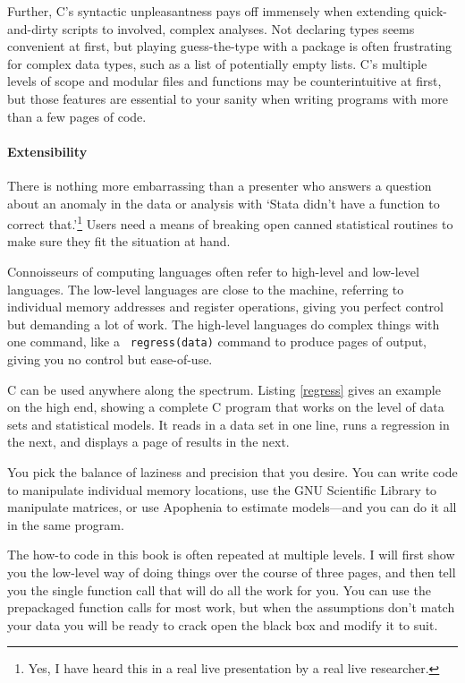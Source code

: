 Further, C's syntactic unpleasantness pays off immensely when extending
quick-and-dirty scripts to involved, complex analyses.
Not declaring types seems convenient at first, but playing guess-the-type
with a package is often frustrating for complex data types, such
as a list of potentially empty lists. C's multiple levels of scope and 
modular files and functions may be counterintuitive at first,
but those features are essential to your sanity when
writing programs with more than a few pages of code.

\paragraph{Extensibility}
There is nothing more embarrassing than a presenter who answers a question
about an anomaly in the data or analysis with `Stata didn't have a function to
correct that.'\footnote{Yes, I have heard this in a real live presentation
by a real live researcher.} Users need a means of breaking open canned
statistical routines to make sure they fit the situation at hand.

Connoisseurs of computing languages often refer to high-level and
low-level languages. The low-level languages are close to the machine,
referring to individual memory addresses and register operations,
giving you perfect control but demanding a lot of work. The high-level
languages do complex things with one command, like a {\tt
regress(data)} command to produce pages of output, giving you no control
but ease-of-use.


C can be used anywhere along the spectrum. Listing \ref{regress} gives
an example on the high end, showing a complete C program that works on
the level of data sets and statistical models. It reads in a data set in
one line, runs a regression in the next, and displays a page of
results in the next.

You pick the balance of laziness and precision that you desire. You
can write code to manipulate individual memory locations, use the GNU Scientific
Library to manipulate matrices, or use Apophenia to estimate models---and
you can do it all in the same program.

The how-to code in this book is often repeated at multiple levels. I
will first show you the low-level way of doing things over the course
of three pages, and then tell you the single function call that will do
all the work for you. You can use the prepackaged function calls for
most work, but when the assumptions don't match your data you will be
ready to crack open the black box and modify it to suit.

